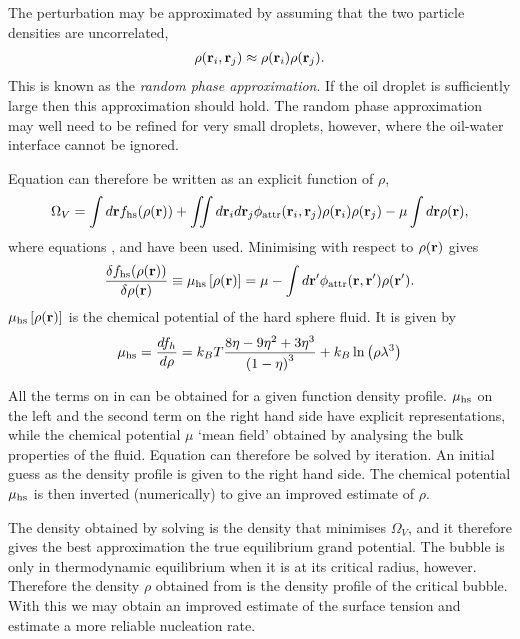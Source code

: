 The perturbation may be approximated by assuming that the two particle densities are uncorrelated, 
\begin{align}
\rho(\textbf{r}_i, \textbf{r}_j) \approx \rho(\textbf{r}_i)\rho(\textbf{r}_j).\label{eqn:RPA}
\end{align}
This is known as the {\em random phase approximation}.
If the oil droplet is sufficiently large then this approximation should hold.
The random phase approximation may well need to be refined for very small droplets, however, 
where the oil-water interface cannot be ignored.

Equation  can therefore be written as an explicit function of $\rho$,
\begin{align}
   \Omega_V = \int d\textbf{r} f_{\text{hs}}(\rho(\textbf{r}))  +   \iint d \textbf{r}_i d\textbf{r}_j \phi_{\text{attr}}( \textbf{r}_i, \textbf{r}_j) \rho(\textbf{r}_i)\rho(\textbf{r}_j) -  \mu \int d\textbf{r} \rho(\textbf{r}),  \label{eqn:OmegaV}
\end{align}
where equations ,  and  have been used.
Minimising  with respect to $\rho(\textbf{r})$ gives
\begin{align}
  \frac{\delta  f_{\text{hs}}(\rho(\textbf{r})) }{\delta \rho(\textbf{r})} \equiv \mu_{\text{hs}}\left[ \rho(\textbf{r}) \right] = \mu - \int d\textbf{r}^\prime \phi_{\text{attr}}( \textbf{r}, \textbf{r}^\prime) \rho(\textbf{r}^\prime). \label{eqn:ChemPots}
\end{align}
$\mu_{\text{hs}}\left[ \rho(\textbf{r}) \right]$ is the chemical potential of the hard sphere fluid.
It is given by 
\begin{align}
 \mu_{\text{hs}} = \frac{d f_h}{d \rho} =  k_B T\frac{8\eta - 9 \eta^2 + 3\eta^3}{\left( 1-\eta \right)^3} + k_B \ln \left( \rho \lambda^3 \right)
\end{align}

All the terms on in  can be obtained for a given function density profile.
$\mu_{\text{hs}}$ on the left and the second term on the right hand side have explicit representations, while
the chemical potential $\mu$ `mean field' obtained by analysing the bulk properties of the fluid.
Equation  can therefore be solved by iteration.
An initial guess as the density profile is given to the right hand side.
The chemical potential $\mu_{\text{hs}}$ is then inverted (numerically) to give an improved estimate of $\rho$.

The density obtained by solving  is the density that minimises $\Omega_V$,
and it therefore gives the best approximation the true equilibrium grand potential.
The bubble is only in thermodynamic equilibrium when it is at its critical radius, however.
Therefore the density $\rho$ obtained from  is the density profile of the critical bubble.
With this we may obtain an improved estimate of the surface tension and estimate a more reliable nucleation rate.



